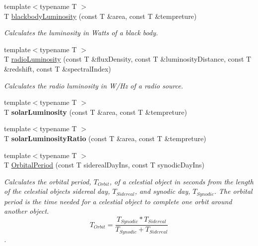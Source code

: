 \begin{DoxyCompactItemize}
{\footnotesize template$<$typename T $>$ }\\T \mbox{\hyperlink{group___e_g_x_phys-_luminosity_ga909f82edfaed449b44e94788b642ebb8}{blackbody\+Luminosity}} (const T \&area, const T \&tempreture)
\begin{DoxyCompactList}\small\item\em Calculates the luminosity in Watts of a black body. \end{DoxyCompactList}\item 
{\footnotesize template$<$typename T $>$ }\\T \mbox{\hyperlink{group___e_g_x_phys-_luminosity_ga6d6865b2aac1bc7c7f06b7c4ac2444e4}{radio\+Luminosity}} (const T \&flux\+Density, const T \&luminosity\+Distance, const T \&redshift, const T \&spectral\+Index)
\begin{DoxyCompactList}\small\item\em Calculates the radio luminosity in W/\+Hz of a radio source. \end{DoxyCompactList}\item 
\mbox{\label{namespace_e_g_x_phys_ade3d05c9dcd810cb5290375d11587b6a}} 
{\footnotesize template$<$typename T $>$ }\\T {\bfseries solar\+Luminosity} (const T \&area, const T \&tempreture)
\item 
\mbox{\label{namespace_e_g_x_phys_ac5e66686d7910587e3636b7984d466e9}} 
{\footnotesize template$<$typename T $>$ }\\T {\bfseries solar\+Luminosity\+Ratio} (const T \&area, const T \&tempreture)
\item 
{\footnotesize template$<$typename T $>$ }\\T \mbox{\hyperlink{group___e_g_x_phys-_astrophysic-_orbital_period_ga76aac7afe3b7a30a785259e9eeb0c139}{Orbital\+Period}} (const T sidereal\+Day\+Ins, const T synodic\+Day\+Ins)
\begin{DoxyCompactList}\small\item\em Calculates the orbital period, $T_{Orbit}$, of a celestial object in seconds from the length of the celestial object\textquotesingle{}s sidereal day, $T_{Sidereal}$, and synodic day, $T_{Synodic}$. The orbital period is the time needed for a celestial object to complete one orbit around another object. \[ T_{Orbit}=\dfrac{T_{Synodic} * T_{Sidereal}}{T_{Synodic} + T_{Sidereal}}\]. \end{DoxyCompactList}\item 

\end{DoxyCompactItemize}
